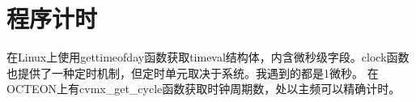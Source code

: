 \section{程序计时}
在Linux上使用gettimeofday函数获取timeval结构体，内含微秒级字段。clock函数也提供了一种定时机制，但定时单元取决于系统。我遇到的都是1微秒。
在OCTEON上有cvmx\_get\_cycle函数获取时钟周期数，处以主频可以精确计时。
